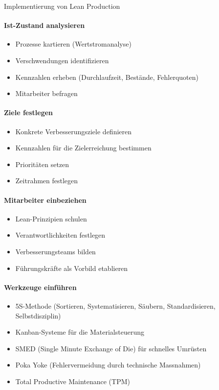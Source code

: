 \begin{KR}{Implementierung von Lean Production}\\
\paragraph{Ist-Zustand analysieren}
\begin{itemize}
    \item Prozesse kartieren (Wertstromanalyse)
    \item Verschwendungen identifizieren
    \item Kennzahlen erheben (Durchlaufzeit, Bestände, Fehlerquoten)
    \item Mitarbeiter befragen
\end{itemize}

\paragraph{Ziele festlegen}
\begin{itemize}
    \item Konkrete Verbesserungsziele definieren
    \item Kennzahlen für die Zielerreichung bestimmen
    \item Prioritäten setzen
    \item Zeitrahmen festlegen
\end{itemize}

\paragraph{Mitarbeiter einbeziehen}
\begin{itemize}
    \item Lean-Prinzipien schulen
    \item Verantwortlichkeiten festlegen
    \item Verbesserungsteams bilden
    \item Führungskräfte als Vorbild etablieren
\end{itemize}

\paragraph{Werkzeuge einführen}
\begin{itemize}
    \item 5S-Methode (Sortieren, Systematisieren, Säubern, Standardisieren, Selbstdisziplin)
    \item Kanban-Systeme für die Materialsteuerung
    \item SMED (Single Minute Exchange of Die) für schnelles Umrüsten
    \item Poka Yoke (Fehlervermeidung durch technische Massnahmen)
    \item Total Productive Maintenance (TPM)
\end{itemize}


\end{KR}
